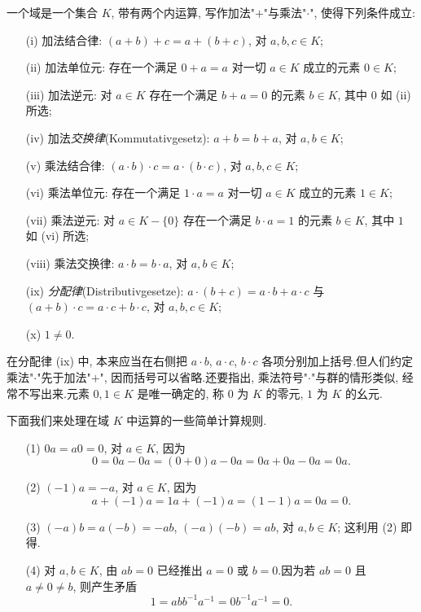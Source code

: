 \begin{definition}[域]\label{def:1.3.1}
一个域是一个集合 $K$, 带有两个内运算, 写作加法"$+$"与乘法"$\cdot$", 使得下列条件成立:
\begin{enumerate}
\item[(i)] 加法结合律: $(a + b) + c = a + (b + c)$, 对 $a, b, c \in K$;
\item[(ii)] 加法单位元: 存在一个满足 $0 + a = a$ 对一切 $a \in K$ 成立的元素 $0 \in K$;
\item[(iii)] 加法逆元: 对 $a \in K$ 存在一个满足 $b + a = 0$ 的元素 $b \in K$, 其中 $0$ 如 (ii) 所选;
\item[(iv)] 加法\emph{交换律}(\textup{Kommutativgesetz}): $a + b = b + a$, 对 $a, b \in K$;
\item[(v)] 乘法结合律: $(a \cdot b) \cdot c = a \cdot (b \cdot c)$, 对 $a, b, c \in K$;
\item[(vi)] 乘法单位元: 存在一个满足 $1 \cdot a = a$ 对一切 $a \in K$ 成立的元素 $1 \in K$;
\item[(vii)] 乘法逆元: 对 $a \in K - \{0\}$ 存在一个满足 $b \cdot a = 1$ 的元素 $b \in K$, 其中 $1$ 如 (vi) 所选;
\item[(viii)] 乘法交换律: $a \cdot b = b \cdot a$, 对 $a, b \in K$;
\item[(ix)] \emph{分配律}(\textup{Distributivgesetze}): $a \cdot (b + c) = a \cdot b + a \cdot c$ 与 $(a + b) \cdot c = a \cdot c + b \cdot c$, 对 $a, b, c \in K$;
\item[(x)] $1 \neq 0$.
\end{enumerate}
\end{definition}

在分配律 (ix) 中, 本来应当在右侧把 $a \cdot b$, $a \cdot c$, $b \cdot c$ 各项分别加上括号.但人们约定乘法"$\cdot$"先于加法"$+$", 因而括号可以省略.还要指出, 乘法符号"$\cdot$"与群的情形类似, 经常不写出来.元素 $0, 1 \in K$ 是唯一确定的, 称 $0$ 为 $K$ 的零元, $1$ 为 $K$ 的幺元.

下面我们来处理在域 $K$ 中运算的一些简单计算规则.

\begin{enumerate}
\item[(1)] $0a = a0 = 0$, 对 $a \in K$, 因为
\[
0 = 0a - 0a = (0 + 0)a - 0a = 0a + 0a - 0a = 0a.
\]
\item[(2)] $(-1)a = -a$, 对 $a \in K$, 因为
\[
a + (-1)a = 1a + (-1)a = (1 - 1)a = 0a = 0.
\]
\item[(3)] $(-a)b = a(-b) = -ab$, $(-a)(-b) = ab$, 对 $a, b \in K$; 这利用 (2) 即得.
\item[(4)] 对 $a, b \in K$, 由 $ab = 0$ 已经推出 $a = 0$ 或 $b = 0$.因为若 $ab = 0$ 且 $a \neq 0 \neq b$, 则产生矛盾
\[
1 = abb^{-1}a^{-1} = 0b^{-1}a^{-1} = 0.
\]
\end{enumerate}

